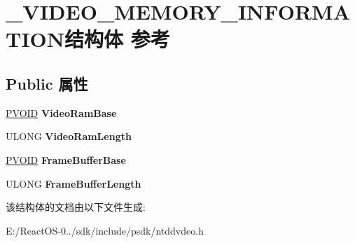 \hypertarget{struct___v_i_d_e_o___m_e_m_o_r_y___i_n_f_o_r_m_a_t_i_o_n}{}\section{\+\_\+\+V\+I\+D\+E\+O\+\_\+\+M\+E\+M\+O\+R\+Y\+\_\+\+I\+N\+F\+O\+R\+M\+A\+T\+I\+O\+N结构体 参考}
\label{struct___v_i_d_e_o___m_e_m_o_r_y___i_n_f_o_r_m_a_t_i_o_n}
\subsection*{Public 属性}
\begin{DoxyCompactItemize}
\item 
\mbox{\label{struct___v_i_d_e_o___m_e_m_o_r_y___i_n_f_o_r_m_a_t_i_o_n_a4fa7e80b306ab401606d5dac7e38a79e}} 
\hyperlink{interfacevoid}{P\+V\+O\+ID} {\bfseries Video\+Ram\+Base}
\item 
\mbox{\label{struct___v_i_d_e_o___m_e_m_o_r_y___i_n_f_o_r_m_a_t_i_o_n_a9269c6d43ed00cf029fbbfbd3d0e1b5a}} 
U\+L\+O\+NG {\bfseries Video\+Ram\+Length}
\item 
\mbox{\label{struct___v_i_d_e_o___m_e_m_o_r_y___i_n_f_o_r_m_a_t_i_o_n_a0eae18992e8bc2063dd77a8ab2047f31}} 
\hyperlink{interfacevoid}{P\+V\+O\+ID} {\bfseries Frame\+Buffer\+Base}
\item 
\mbox{\label{struct___v_i_d_e_o___m_e_m_o_r_y___i_n_f_o_r_m_a_t_i_o_n_a8f78f5e9089fe17060d45770beed4768}} 
U\+L\+O\+NG {\bfseries Frame\+Buffer\+Length}
\end{DoxyCompactItemize}


该结构体的文档由以下文件生成\+:\begin{DoxyCompactItemize}
\item 
E\+:/\+React\+O\+S-\/0../sdk/include/psdk/ntddvdeo.\+h\end{DoxyCompactItemize}
